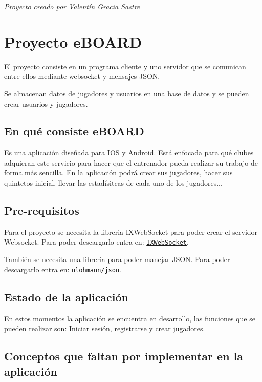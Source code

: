 

 {\itshape Proyecto creado por Valentín Gracia Sastre} 



\section*{Proyecto e\+B\+O\+A\+RD}

El proyecto consiste en un programa cliente y uno servidor que se comunican entre ellos mediante websocket y mensajes J\+S\+ON.

Se almacenan datos de jugadores y usuarios en una base de datos y se pueden crear usuarios y jugadores.

\subsection*{En qué consiste e\+B\+O\+A\+RD}

Es una aplicación diseñada para I\+OS y Android. Está enfocada para qué clubes adquieran este servicio para hacer que el entrenador pueda realizar su trabajo de forma más sencilla. En la aplicación podrá crear sus jugadores, hacer sus quintetos inicial, llevar las estadísitcas de cada uno de los jugadores...

\subsection*{Pre-\/requisitos}

Para el proyecto se necesita la libreria I\+X\+Web\+Socket para poder crear el servidor Websocket. Para poder descargarlo entra en\+: \href{https://github.com/machinezone/IXWebSocket}{\tt I\+X\+Web\+Socket}.

También se necesita una libreria para poder manejar J\+S\+ON. Para poder descargarlo entra en\+: \href{https://github.com/nlohmann/json}{\tt nlohmann/json}.

\subsection*{Estado de la aplicación}

En estos momentos la aplicación se encuentra en desarrollo, las funciones que se pueden realizar son\+: Iniciar sesión, registrarse y crear jugadores.

\subsection*{Conceptos que faltan por implementar en la aplicación}

